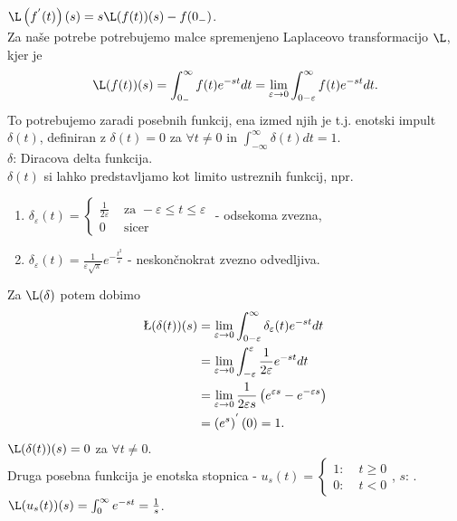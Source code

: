 \documentclass[a4paper, 12pt]{book}
\theoremstyle{definition}
\theoremstyle{remark}
\begin{document}
$\L\left(f^{'}(t)\right)(s) = s \L(f(t))(s) - f(0_-)$. \\
Za naše potrebe potrebujemo malce spremenjeno Laplaceovo transformacijo $\L$, kjer je
\begin{equation*}
    \L(f(t))(s) = \int_{0_-}^{\infty} f(t) e^{-st} dt =
    \lim_{\varepsilon \to 0} \int_{0-\varepsilon}^{\infty} f(t) e^{-st} dt.
\end{equation*}
To potrebujemo zaradi posebnih funkcij, ena izmed njih je t.j. enotski impult $\delta(t)$,
definiran z $\delta(t) = 0$ za $\forall t \neq 0$ in $\int_{-\infty}^{\infty} \delta(t) dt = 1$. \\
$\delta$: Diracova delta funkcija. \\
$\delta(t)$ si lahko predstavljamo kot limito ustreznih funkcij, npr.
\begin{enumerate}[label=\alph*)]
    \item $\delta_{\varepsilon}(t) = \begin{cases}
        \frac{1}{2 \varepsilon} & \text{ za } -\varepsilon \leq t \leq \varepsilon \\
        0 & \text{ sicer}
        \end{cases}$ - odsekoma zvezna,
    \item $\delta_{\varepsilon}(t) = \frac{1}{\varepsilon \sqrt{\pi}} e^{-\frac{t^2}{\varepsilon}}$ -
      neskončnokrat zvezno odvedljiva.
\end{enumerate}
Za $\L(\delta)$ potem dobimo
\begin{align*}
    \L(\delta(t))(s) &= \lim_{\varepsilon \to 0} \int_{0 - \varepsilon}^{\infty} \delta_{\varepsilon}(t) e^{-st} dt \\
    &= \lim_{\varepsilon \to 0} \int_{-\varepsilon}^{\varepsilon} \frac{1}{2 \varepsilon} e^{-st} dt \\
    &= \lim_{\varepsilon \to 0} \frac{1}{2 \varepsilon s} \left(e^{\varepsilon s} - e^{-\varepsilon s}\right) \\
    &= \left(e^{s}\right)^{'}(0) = 1.
\end{align*}
$\L(\delta(t))(s) = 0$ za $\forall t \neq 0$. \\
Druga posebna funkcija je enotska stopnica - $u_s(t) = \begin{cases}
    1: \; &t \geq 0 \\
    0: \; &t < 0
\end{cases}$, $s$: . \\
$\L(u_s(t))(s) = \int_0^{\infty} e^{-st} = \frac{1}{s}$. \\
\end{document}
